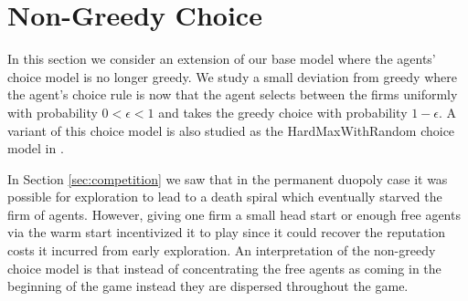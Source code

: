 \documentclass[../competing_bandits.tex]{subfiles}
\begin{document}
\section{Non-Greedy Choice}\label{sec:non_greedy}

In this section we consider an extension of our base model where the agents' choice model is no longer greedy. We study a small deviation from greedy where the agent's choice rule is now that the agent selects between the firms uniformly with probability $0 < \epsilon < 1$ and takes the greedy choice with probability $1 - \epsilon$. A variant of this choice model is also studied as the HardMaxWithRandom choice model in \cite{mansour2018competing}.

In Section \ref{sec:competition} we saw that in the permanent duopoly case it was possible for exploration to lead to a death spiral which eventually starved the firm of agents. However, giving one firm a small head start or enough free agents via the warm start incentivized it to play \TS since it could recover the reputation costs it incurred from early exploration. An interpretation of the non-greedy choice model is that instead of concentrating the free agents as coming in the beginning of the game instead they are dispersed throughout the game.
\end{document}
